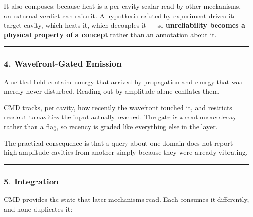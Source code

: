 \documentclass[
  11pt,
  a4paper,
]{article}
\begin{document}
It also composes: because heat is a per-cavity scalar read by other
mechanisms, an external verdict can raise it. A hypothesis refuted by
experiment drives its target cavity, which heats it, which decouples it
--- so \textbf{unreliability becomes a physical property of a concept}
rather than an annotation about it.

\begin{center}\rule{0.5\linewidth}{0.5pt}\end{center}

\subsubsection{4. Wavefront-Gated
Emission}\label{wavefront-gated-emission}

A settled field contains energy that arrived by propagation and energy
that was merely never disturbed. Reading out by amplitude alone
conflates them.

CMD tracks, per cavity, how recently the wavefront touched it, and
restricts readout to cavities the input actually reached. The gate is a
continuous decay rather than a flag, so recency is graded like
everything else in the layer.

The practical consequence is that a query about one domain does not
report high-amplitude cavities from another simply because they were
already vibrating.

\begin{center}\rule{0.5\linewidth}{0.5pt}\end{center}

\subsubsection{5. Integration}\label{integration}

CMD provides the state that later mechanisms read. Each consumes it
differently, and none duplicates it:
\end{document}
